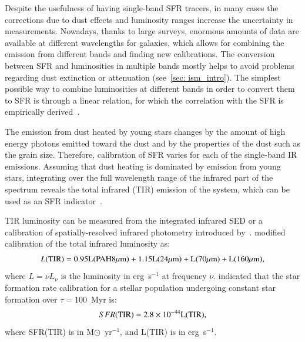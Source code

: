 Despite the usefulness of having single-band SFR tracers, in many cases the corrections due to dust effects and luminosity ranges increase the uncertainty in measurements.
Nowadays, thanks to large surveys, enormous amounts of data are available at different wavelengths for galaxies, which allows for combining the emission from different bands and finding new calibrations.
The conversion between SFR and luminosities in multiple bands mostly helps to avoid problems regarding dust extinction or attenuation (see~\ref{sec: ism_intro}). 
The simplest possible way to combine luminosities at different bands in order to convert them to SFR is through a linear relation, for which the correlation with the SFR is empirically derived~\citep{Kennicutt12}.

The emission from dust heated by young stars changes by the amount of high energy photons emitted toward the dust and by the properties of the dust such as the grain size.
Therefore, calibration of SFR varies for each of the single-band IR emissions.
Assuming that dust heating is dominated by emission from young stars, integrating over the full wavelength range of the infrared part of the spectrum reveals the total infrared (TIR) emission of the system, which can be used as an SFR indicator~\citep{Kennicutt98b}. 
 
TIR luminosity can be measured from the integrated infrared SED or a calibration of spatially-resolved infrared photometry introduced by~\cite{Draine07}. 
\cite{Boquien10} modified calibration of the total infrared luminosity as: 
\begin{equation}
L(\rm TIR) = 0.95L(PAH 8 \mu m) + 1.15L(24 \mu m) + L(70 \mu m) + L(160 \mu m),
\end{equation}
where $L = \nu L_{\nu}$ is the luminosity in erg~s$^{-1}$ at frequency $\nu$. 
\cite{Calzetti07} indicated that the star formation rate calibration for a stellar population undergoing constant star formation over $\tau=$100~Myr is:
\begin{equation}
\label{sfr_tot_IR}
SFR(\rm TIR) = 2.8 \times10^{-44}L(\rm TIR),
\end{equation}
where SFR(TIR) is in M${\odot}$~yr$^{-1}$, and L(TIR) is in erg~s$^{-1}$. 


